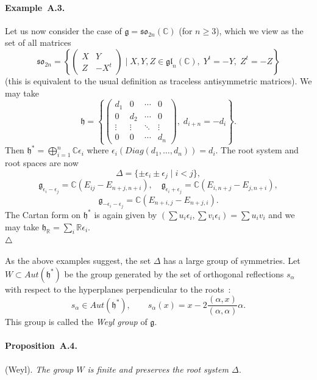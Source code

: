 \documentclass[a4paper,10pt]{amsart}
\def\endexample{$\hfill \triangle$}
\def\a{\alpha}
\def\C{\mathbb{C}}
\def\g{\mathfrak{g}}
\def\h{\mathfrak{h}}
\numberwithin{equation}{section}
\begin{document}
{\paragraph{\textbf{Example~A.3.}} Let us now consider the case of $\g=\mathfrak{so}_{2n}(\C)$ (for $n \geq 3$), which we view as the set of all matrices
$$\mathfrak{so}_{2n}=\left\{ \begin{pmatrix} X & Y \\ Z & -X^t \end{pmatrix} \;|\; X,Y,Z \in \mathfrak{gl}_n(\C), \; Y^t=-Y, \;Z^t=-Z\right\}$$
(this is equivalent to the usual definition as traceless antisymmetric matrices). We may take
$$\h=\left\{ \begin{pmatrix} d_1 & 0 &\cdots & 0\\ 0 & d_2 & \cdots & 0\\ \vdots &\vdots & \ddots & \vdots \\ 0 & 0 & \cdots & d_n \end{pmatrix}, \;  d_{i+n}=-d_i\right\}.$$
Then $\h^* =\bigoplus_{i=1}^n \C \epsilon_i$ where $\epsilon_i(Diag(d_1, \ldots, d_n))=d_i$. The root system and root spaces are now
$$\Delta=\{ \pm \epsilon_i \pm \epsilon_j\;|\; i < j\}, $$
$$\g_{\epsilon_i -\epsilon_j}=\C(E_{ij}-E_{n+j,n+i}), \quad \g_{\epsilon_i +\epsilon_j}=\C(E_{i,n+j}-E_{j,n+i}),$$
$$\g_{-\epsilon_i -\epsilon_j}=\C(E_{n+i,j}-E_{n+j,i}).$$
The Cartan form on $\h^*$ is again given by $(\sum u_i \epsilon_i, \sum v_i \epsilon_i)=\sum u_i v_i$ and we may take $\h_{\mathbb{R}}=\sum_{i} \mathbb{R} \epsilon_i$. \\
\endexample

\vspace{.15in}

As the above examples suggest, the set $\Delta$ has a large group of symmetries.  Let $W \subset {Aut}(\h^*)$ be the group generated by the set of orthogonal reflections $s_{\alpha}$ with respect to the hyperplanes perpendicular to the roots~:
$$s_{\alpha} \in {Aut}(\h^*), \qquad s_{\a}(x)=x-2 \frac{(\alpha,x)}{(\alpha,\alpha)} \alpha.$$
This group is called the \textit{Weyl group} of $\g$.

\vspace{.1in}

\paragraph{\textbf{Proposition~A.4.}}(Weyl).  \textit{The group $W$ is finite and preserves the root system $\Delta$. }

}
\end{document}
